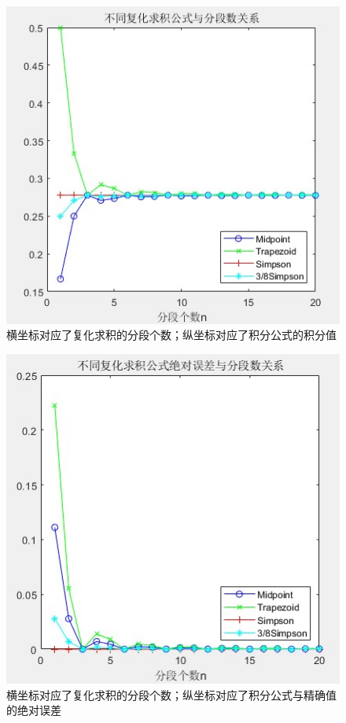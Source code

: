\documentclass[12pt]{article}
\begin{document}
\begin{figure}[h]
	\centering
	\includegraphics[width=1\textwidth]{1}
	\caption{横坐标对应了复化求积的分段个数；纵坐标对应了积分公式的积分值}
\end{figure}
\begin{figure}[h]
	\centering
	\includegraphics[width=1\textwidth]{2}
	\caption{横坐标对应了复化求积的分段个数；纵坐标对应了积分公式与精确值的绝对误差}
\end{figure}
\end{document}
